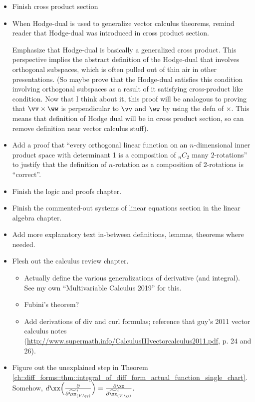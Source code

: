 \begin{itemize}
    \item Finish cross product section
    \item When Hodge-dual is used to generalize vector calculus theorems, remind reader that Hodge-dual was introduced in cross product section. 
    
    Emphasize that Hodge-dual is basically a generalized cross product. This perspective implies the abstract definition of the Hodge-dual that involves orthogonal subspaces, which is often pulled out of thin air in other presentations. (So maybe prove that the Hodge-dual satisfies this condition involving orthogonal subspaces as a result of it satisfying cross-product like condition. Now that I think about it, this proof will be analogous to proving that $\vv \times \ww$ is perpendicular to $\vv$ and $\ww$ by using the defn of $\times$. This means that definition of Hodge dual will be in cross product section, so can remove definition near vector calculus stuff).
    \item Add a proof that ``every orthogonal linear function on an $n$-dimensional inner product space with determinant 1 is a composition of $_{n}C_2$ many $2$-rotations'' to justify that the definition of $n$-rotation as a composition of $2$-rotations is ``correct''.
    \item Finish the logic and proofs chapter.
    \item Finish the commented-out systems of linear equations section in the linear algebra chapter.
    \item Add more explanatory text in-between definitions, lemmas, theorems where needed.
    \item Flesh out the calculus review chapter.
    \begin{itemize}
        \item Actually define the various generalizations of derivative (and integral). See my own ``Multivariable Calculus 2019'' for this.
        \item Fubini's theorem?
        \item Add derivations of div and curl formulas; reference that guy's 2011 vector calculus notes (\url{http://www.supermath.info/CalculusIIIvectorcalculus2011.pdf}, p. 24 and 26).
    \end{itemize}
    \item Figure out the unexplained step in Theorem \ref{ch::diff_forms::thm::integral_of_diff_form_actual_function_single_chart}. Somehow, $d\xx \Big( \frac{\pd}{\pd \tx^i_{(V, \yy)}} \Big) = \frac{\pd \xx}{\pd \tx^i_{(V, \yy)}}$. 

\end{itemize}
